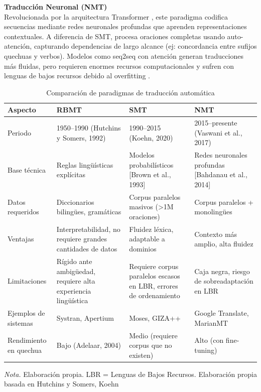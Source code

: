         \textbf{Traducción Neuronal (NMT)}\\
        Revolucionada por la arquitectura Transformer \cite{vaswani2017attention}, este paradigma codifica secuencias mediante redes neuronales profundas que aprenden representaciones contextuales. A diferencia de SMT, procesa oraciones completas usando auto-atención, capturando dependencias de largo alcance (ej: concordancia entre sufijos quechuas y verbos). Modelos como seq2seq con atención \cite{bahdanau2014neural} generan traducciones más fluidas, pero requieren enormes recursos computacionales y sufren con lenguas de bajos recursos debido al overfitting \cite{koehn2020neural}.

        \begin{table}[h!]
            \centering
            \caption{Comparación de paradigmas de traducción automática}
            \begin{tabularx}{\textwidth}{|l|X|X|X|}
            \hline
            \textbf{Aspecto} & \textbf{RBMT} & \textbf{SMT} & \textbf{NMT} \\
            \hline
            Periodo & 1950--1990 (Hutchins y Somers, 1992) & 1990--2015 (Koehn, 2020) & 2015--presente (Vaswani et al., 2017) \\
            \hline
            Base técnica & Reglas lingüísticas explícitas & Modelos probabilísticos [Brown et al., 1993]  & Redes neuronales profundas [Bahdanau et al., 2014] \\
            \hline
            Datos requeridos & Diccionarios bilingües, gramáticas & Corpus paralelos masivos (\textgreater1M oraciones) & Corpus paralelos + monolingües \\
            \hline
            Ventajas & Interpretabilidad, no requiere grandes cantidades de datos & Fluidez léxica, adaptable a dominios & Contexto más amplio, alta fluidez \\
            \hline
            Limitaciones & Rígido ante ambigüedad, requiere alta experiencia lingüística & Requiere corpus paralelos escasos en LBR, errores de ordenamiento & Caja negra, riesgo de sobreadaptación en LBR \\
            \hline
            Ejemplos de sistemas & Systran, Apertium & Moses, GIZA++ & Google Translate, MarianMT \\
            \hline
            Rendimiento en quechua & Bajo (Adelaar, 2004) & Medio (requiere corpus que no existen) & Alto (con fine-tuning) \\
            \hline
            \end{tabularx}
            \label{tab:comparacion_paradigmas}
            \vspace{0.5cm}
            \textit{Nota.} Elaboración propia. LBR = Lenguas de Bajos Recursos. Elaboración propia basada en Hutchins y Somers, Koehn
        \end{table}


